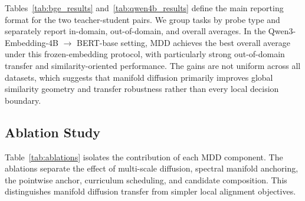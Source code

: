Tables~\ref{tab:bge_results} and~\ref{tab:qwen4b_results} define the main reporting format for the two teacher-student pairs. We group tasks by probe type and separately report in-domain, out-of-domain, and overall averages. In the Qwen3-Embedding-4B $\rightarrow$ BERT-base setting, MDD achieves the best overall average under this frozen-embedding protocol, with particularly strong out-of-domain transfer and similarity-oriented performance. The gains are not uniform across all datasets, which suggests that manifold diffusion primarily improves global similarity geometry and transfer robustness rather than every local decision boundary.



\subsection{Ablation Study}

Table~\ref{tab:ablations} isolates the contribution of each MDD component. The ablations separate the effect of multi-scale diffusion, spectral manifold anchoring, the pointwise anchor, curriculum scheduling, and candidate composition. This distinguishes manifold diffusion transfer from simpler local alignment objectives.



\FloatBarrier
